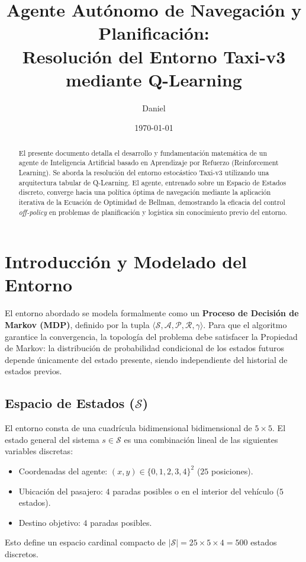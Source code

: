 \documentclass[12pt,a4paper]{article}
\title{\textbf{Agente Autónomo de Navegación y Planificación:\\Resolución del Entorno Taxi-v3 mediante Q-Learning}}
\author{Daniel}
\date{\today}
\begin{document}
\maketitle

\begin{abstract}
El presente documento detalla el desarrollo y fundamentación matemática de un agente de Inteligencia Artificial basado en Aprendizaje por Refuerzo (Reinforcement Learning). Se aborda la resolución del entorno estocástico Taxi-v3 utilizando una arquitectura tabular de Q-Learning. El agente, entrenado sobre un Espacio de Estados discreto, converge hacia una política óptima de navegación mediante la aplicación iterativa de la Ecuación de Optimidad de Bellman, demostrando la eficacia del control \textit{off-policy} en problemas de planificación y logística sin conocimiento previo del entorno.
\end{abstract}

\tableofcontents
\newpage

\section{Introducción y Modelado del Entorno}

El entorno abordado se modela formalmente como un \textbf{Proceso de Decisión de Markov (MDP)}, definido por la tupla $\langle \mathcal{S}, \mathcal{A}, \mathcal{P}, \mathcal{R}, \gamma \rangle$. Para que el algoritmo garantice la convergencia, la topología del problema debe satisfacer la Propiedad de Markov: la distribución de probabilidad condicional de los estados futuros depende únicamente del estado presente, siendo independiente del historial de estados previos.

\subsection{Espacio de Estados ($\mathcal{S}$)}
El entorno consta de una cuadrícula bidimensional bidimensional de $5 \times 5$. El estado general del sistema $s \in \mathcal{S}$ es una combinación lineal de las siguientes variables discretas:
\begin{itemize}
    \item Coordenadas del agente: $(x, y) \in \{0, 1, 2, 3, 4\}^2$ ($25$ posiciones).
    \item Ubicación del pasajero: $4$ paradas posibles o en el interior del vehículo ($5$ estados).
    \item Destino objetivo: $4$ paradas posibles.
\end{itemize}
Esto define un espacio cardinal compacto de $|\mathcal{S}| = 25 \times 5 \times 4 = 500$ estados discretos.
\end{document}
